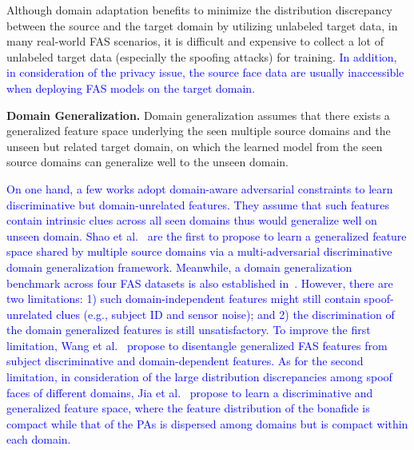 \documentclass[10pt,journal,compsoc]{IEEEtran}
\begin{document}
Although domain adaptation benefits to minimize the distribution discrepancy between the source and the target domain by utilizing unlabeled target data, in many real-world FAS scenarios, it is difficult and expensive to collect a lot of unlabeled target data (especially the spoofing attacks) for training. \textcolor{blue}{In addition, in consideration of the privacy issue, the source face data are usually inaccessible when deploying FAS models  on the target domain.}






\vspace{0.4em}
\noindent\textbf{Domain Generalization.}\quad   
Domain generalization assumes that there exists a generalized feature space underlying the seen multiple source domains and the unseen but related target domain, on which the learned model from the seen source domains can generalize well to the unseen domain.

\textcolor{blue}{On one hand, a few works adopt domain-aware adversarial constraints to learn discriminative but domain-unrelated features. They assume that such features contain intrinsic clues across all seen domains thus would generalize well on unseen domain. Shao et al.~\cite{shao2019multi} are the first to propose to learn a generalized feature space shared by multiple source domains via a multi-adversarial discriminative domain generalization framework. Meanwhile, a domain generalization benchmark across four FAS datasets is also established in~\cite{shao2019multi}. However, there are two limitations: 1) such domain-independent features might still contain spoof-unrelated clues (e.g., subject ID and sensor noise); and 2) the discrimination of the domain generalized features is still unsatisfactory. To improve the first limitation, Wang et al.~\cite{wang2020cross} propose to disentangle generalized FAS features from subject discriminative and domain-dependent features. As for the second limitation, in consideration of the large distribution discrepancies among spoof faces of different domains, Jia et al.~\cite{jia2020single} propose to learn a discriminative and generalized feature space, where the feature distribution of the bonafide is compact while that of the PAs is dispersed among domains but is compact within each domain.} 
\end{document}
